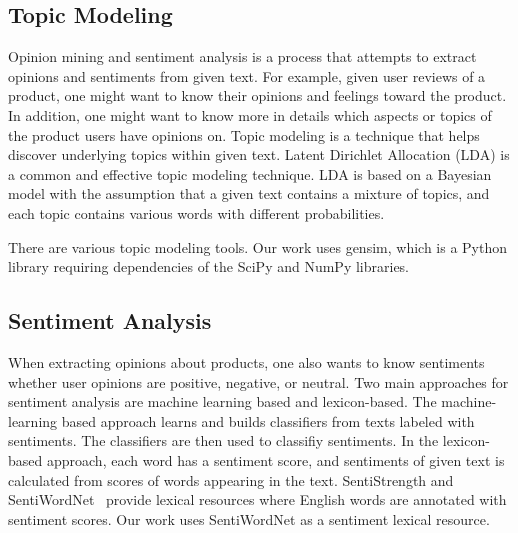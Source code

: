 

\subsection{Topic Modeling}

Opinion mining and sentiment analysis is a process that attempts to extract opinions and sentiments from given text\cite{surveyopinionmining}. For example, given user reviews of a product, one might want to know their opinions and feelings toward the product. In addition, one might want to know more in details which aspects or topics of the product users have opinions on. Topic modeling is a technique that helps discover underlying topics within given text. Latent Dirichlet Allocation (LDA)\cite{LDA} is a common and effective topic modeling technique. LDA is based on a Bayesian model with the assumption that a given text contains a mixture of topics, and each topic contains various words with different probabilities.

There are various topic modeling tools. Our work uses gensim\cite{gensim}, which is a Python library requiring dependencies of the SciPy and NumPy libraries.

\subsection{Sentiment Analysis}

When extracting opinions about products, one also wants to know sentiments whether user opinions are positive, negative, or neutral. Two main approaches for sentiment analysis are machine learning based and lexicon-based. The machine-learning based approach learns and builds classifiers from texts labeled with sentiments. The classifiers are then used to classifiy sentiments. In the lexicon-based approach, each word has a sentiment score, and sentiments of given text is calculated from scores of words appearing in the text. SentiStrength \cite{SentiStrength} and SentiWordNet~\cite{SentiWordNet} provide lexical resources where English words are annotated with sentiment scores. Our work uses SentiWordNet as a sentiment lexical resource.













